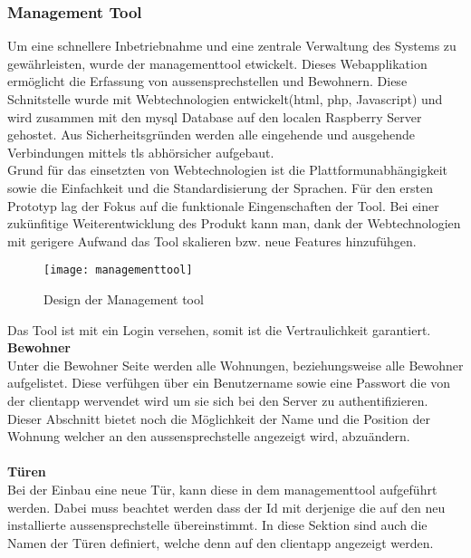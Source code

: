 \subsubsection{Management Tool}
\label{kap:managementtool}
Um eine schnellere Inbetriebnahme und eine zentrale Verwaltung des Systems zu gewährleisten, wurde der \gls{managementtool} etwickelt. Dieses Webapplikation ermöglicht die Erfassung von \gls{aussensprechstelle}n und Bewohnern.
Diese Schnitstelle wurde mit Webtechnologien entwickelt(\gls{html}, \gls{php}, Javascript) und wird zusammen mit den \gls{mysql} Database auf den localen Raspberry Server gehostet. Aus Sicherheitsgründen werden alle eingehende und ausgehende Verbindungen mittels \gls{tls} abhörsicher aufgebaut.
\\
Grund für das einsetzten von Webtechnologien ist die Plattformunabhängigkeit sowie die Einfachkeit und die Standardisierung der Sprachen. Für den ersten Prototyp lag der Fokus auf die funktionale Eingenschaften der Tool. Bei einer zukünfitige Weiterentwicklung des Produkt kann man, dank der Webtechnologien mit gerigere Aufwand das Tool skalieren bzw. neue Features hinzufühgen.  

\begin{figure}[htb!]
	\begin{center}
		\texttt{[image: managementtool]}
		\caption[Design der Management tool]{Design der Management tool}
		\label{fig:managementtool}
	\end{center}
\end{figure}

Das Tool ist mit ein Login versehen, somit ist die Vertraulichkeit garantiert.
\\
\newline
\textbf{Bewohner} 
\\
Unter die Bewohner Seite werden alle Wohnungen, beziehungsweise alle Bewohner aufgelistet. Diese verfühgen über ein Benutzername sowie eine Passwort die von der \gls{clientapp} wervendet wird um sie sich bei den Server zu authentifizieren. Dieser Abschnitt bietet noch die Möglichkeit der Name und die Position der Wohnung welcher an den \gls{aussensprechstelle} angezeigt wird, abzuändern.
\\
\\
\textbf{Türen} 
\\
Bei der Einbau eine neue Tür, kann diese in dem \gls{managementtool} aufgeführt werden. Dabei muss beachtet werden dass der Id mit derjenige die auf den neu installierte \gls{aussensprechstelle} übereinstimmt. In diese Sektion sind auch die Namen der Türen definiert, welche denn auf den \gls{clientapp} angezeigt werden. 


